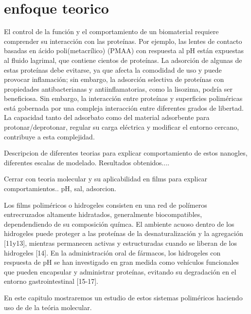 \section{enfoque teorico}


  El control de la funci\'on y el comportamiento de un biomaterial requiere comprender su interacci\'on con las prote\'inas. Por ejemplo, las lentes de contacto basadas en \'acido poli(metacr\'ilico) (PMAA) con respuesta al pH est\'an expuestas al fluido lagrimal, que contiene cientos de prote\'inas. La adsorci\'on de algunas de estas prote\'inas debe evitarse, ya que afecta la comodidad de uso y puede provocar inflamaci\'on; sin embargo, la adsorci\'on selectiva de prote\'inas con propiedades antibacterianas y antiinflamatorias, como la lisozima, podr\'ia ser beneficiosa. Sin embargo, la interacci\'on entre prote\'inas y superficies polim\'ericas est\'a gobernada por una compleja interacci\'on entre diferentes grados de libertad. La capacidad tanto del adsorbato como del material adsorbente para protonar/deprotonar, regular su carga el\'ectrica y modificar el entorno cercano, contribuye a esta complejidad.

Descripcion de diferentes teorias para explicar comportamiento de estos nanogles, diferentes escalas de modelado.
Resultados obtenidos....

Cerrar con teoria molecular y su aplicabilidad en films para explicar comportamientos.. pH, sal, adsorcion.

Los films polim\'ericos o hidrogeles  consisten en una red de pol\'imeros entrecruzados altamente hidratados, generalmente biocompatibles, dependendiendo de su composici\'on qu\'imca. El ambiente acuoso dentro de los hidrogeles puede proteger a las prote\'inas de la desnaturalización y la agregaci\'on [11y13], mientras permanecen activas y estructuradas cuando se liberan de los hidrogeles [14]. En la administraci\'on oral de f\'armacos, los hidrogeles con respuesta de pH se han investigado en gran medida como veh\'iculos funcionales que pueden encapsular y administrar prote\'inas, evitando su degradaci\'on en el entorno gastrointestinal [15-17].


En este capitulo mostraremos un estudio  de estos sistemas polim\'ericos haciendo uso de de la te\'oria molecular.



